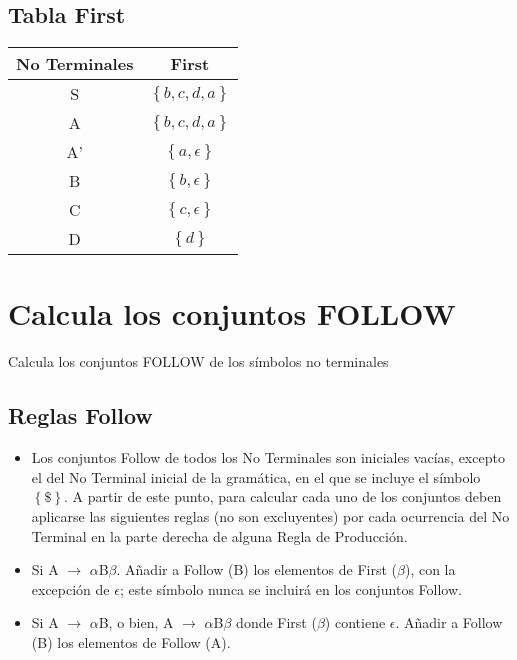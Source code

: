 \documentclass[10pt]{article}
\begin{document}
\subsection{Tabla First}
\begin{center}
\begin{tabular}{|c| c| } 
 \hline
 No Terminales & First \\ [0.5ex] 
 \hline
 S & $\left \{b, c, d, a  \right \}$ \\ 
 \hline
 A & $\left \{b, c, d, a  \right \}$  \\
 \hline
 A' & $\left \{a, \epsilon  \right \}$  \\
 \hline
 B & $\left \{b, \epsilon  \right \}$\\
 \hline
 C & $\left \{c, \epsilon  \right \}$ \\ 
 \hline
 D & $\left \{d  \right \}$ \\ 
 \hline
\end{tabular}
\end{center}

\section{Calcula los conjuntos FOLLOW }
Calcula los conjuntos FOLLOW de los símbolos no terminales
\subsection{Reglas Follow}
\begin{itemize}
    \item Los conjuntos Follow de todos los No Terminales son iniciales vacías, excepto el del No Terminal inicial de la gramática, en el que se incluye el símbolo $\left \{\$  \right \}$. A partir de este punto, para calcular cada uno de los conjuntos deben aplicarse las siguientes reglas (no son excluyentes) por cada ocurrencia del No Terminal en la parte derecha de alguna Regla de Producción.
    \item Si A $\rightarrow$ $\alpha$B$\beta$. Añadir a Follow (B) los elementos de First ($\beta$), con la excepción de $\epsilon$; este símbolo nunca se incluirá en los conjuntos Follow.
    \item Si A $\rightarrow$ $\alpha$B, o bien, A $\rightarrow$ $\alpha$B$\beta$ donde First ($\beta$) contiene $\epsilon$. Añadir a Follow (B) los elementos de Follow (A).
\end{itemize}
\end{document}
